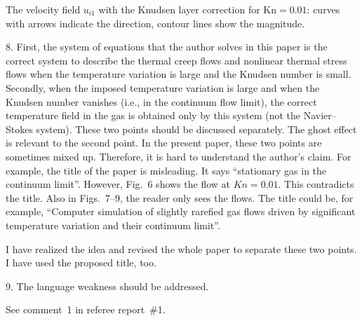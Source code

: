 \documentclass{article}
\newcommand{\Kn}{\mathrm{Kn}}
\begin{document}
\begin{leftbar}
The velocity field \(u_{i1}\) with the Knudsen layer correction for \(\Kn=0.01\):
curves with arrows indicate the direction, contour lines show the magnitude.
\end{leftbar}

\begin{quoting}
8. First, the system of equations that the author solves in this paper
is the correct system to describe the thermal creep flows and nonlinear
thermal stress flows when the temperature variation is large and the
Knudsen number is small. Secondly, when the imposed temperature
variation is large and when the Knudsen number vanishes (i.e., in the
continuum flow limit), the correct temperature field in the gas is
obtained only by this system (not the Navier--Stokes system). These two
points should be discussed separately. The ghost effect is relevant to
the second point. In the present paper, these two points are sometimes
mixed up. Therefore, it is hard to understand the author's claim. For
example, the title of the paper is misleading. It says ``stationary gas
in the continuum limit''. However, Fig.~6 shows the flow at \(Kn=0.01\).
This contradicts the title. Also in Figs.~7--9, the reader only sees the
flows. The title could be, for example, ``Computer simulation of
slightly rarefied gas flows driven by significant temperature variation
and their continuum limit''.
\end{quoting}

I have realized the idea and revised the whole paper to separate these two points.
I have used the proposed title, too.

\begin{leftbar}
\end{leftbar}

\begin{quoting}
9. The language weakness should be addressed.
\end{quoting}

See comment~1 in referee report~\#1.




\end{document}
